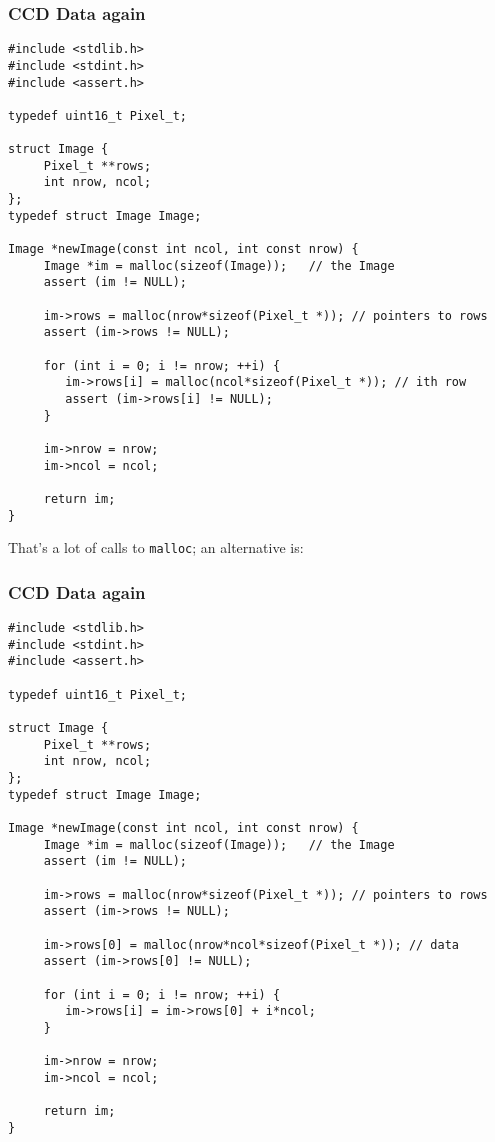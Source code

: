 \documentclass[10pt, t]{beamer}
\begin{document}
\begin{frame}[fragile]
\frametitle{CCD Data again}
\label{sec-5_1_21}

\begin{verbatim}
#include <stdlib.h>
#include <stdint.h>
#include <assert.h>
  
typedef uint16_t Pixel_t;

struct Image {
     Pixel_t **rows;
     int nrow, ncol;
};
typedef struct Image Image;

Image *newImage(const int ncol, int const nrow) {
     Image *im = malloc(sizeof(Image));   // the Image
     assert (im != NULL);
     
     im->rows = malloc(nrow*sizeof(Pixel_t *)); // pointers to rows
     assert (im->rows != NULL);
  
     for (int i = 0; i != nrow; ++i) {
        im->rows[i] = malloc(ncol*sizeof(Pixel_t *)); // ith row
        assert (im->rows[i] != NULL);
     }
  
     im->nrow = nrow;
     im->ncol = ncol;
  
     return im;
}
\end{verbatim}
That's a lot of calls to \texttt{malloc}; an alternative is:
\end{frame}
\begin{frame}[fragile]
\frametitle{CCD Data again}
\label{sec-5_1_22}

\begin{verbatim}
#include <stdlib.h>
#include <stdint.h>
#include <assert.h>
  
typedef uint16_t Pixel_t;

struct Image {
     Pixel_t **rows;
     int nrow, ncol;
};
typedef struct Image Image;

Image *newImage(const int ncol, int const nrow) {
     Image *im = malloc(sizeof(Image));   // the Image
     assert (im != NULL);
     
     im->rows = malloc(nrow*sizeof(Pixel_t *)); // pointers to rows
     assert (im->rows != NULL);
  
     im->rows[0] = malloc(nrow*ncol*sizeof(Pixel_t *)); // data
     assert (im->rows[0] != NULL);
  
     for (int i = 0; i != nrow; ++i) {
        im->rows[i] = im->rows[0] + i*ncol;
     }
  
     im->nrow = nrow;
     im->ncol = ncol;
  
     return im;
}
\end{verbatim}
\end{frame}
\end{document}
